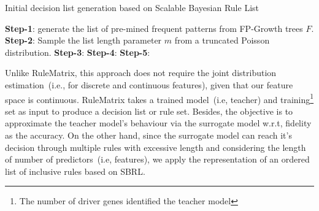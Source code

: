 \begin{algorithm*}[h]
\caption{Initial decision list generation based on Scalable Bayesian Rule List}
\small{
    \DontPrintSemicolon {}%
    \BlankLine%
    \textbf{Step-1}: generate the list of pre-mined frequent patterns from FP-Growth trees $F$.\;
    \textbf{Step-2}: Sample the list length parameter $m$ from a truncated Poisson distribution.\;
    \textbf{Step-3}: 
    \textbf{Step-4}: 
    \BlankLine%
    \textbf{Step-5}: 
    }
    \label{algo:initial_decision_lis_generation}
\end{algorithm*}

\hspace*{3.5mm} Unlike RuleMatrix, this approach does not require the joint distribution estimation~(i.e., for discrete and continuous features), given that our feature space is continuous. RuleMatrix takes a trained model~(i.e, teacher) and training\footnote{The number of driver genes identified the teacher model} set as input to produce a decision list or rule set.
Besides, the objective is to approximate the teacher model's behaviour via the surrogate model w.r.t, fidelity as the accuracy. On the other hand, since the surrogate model can reach it's decision through multiple rules with excessive length and  
considering the length of number of predictors~(i.e, features), we apply the representation of an ordered list of inclusive rules based on SBRL. 

